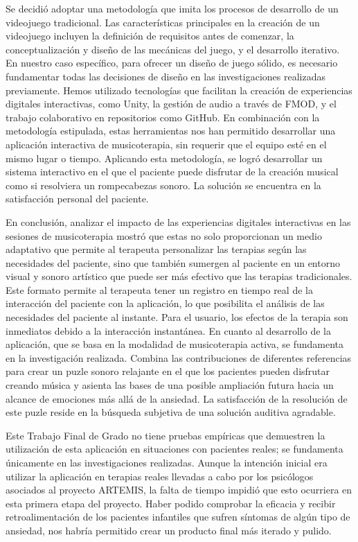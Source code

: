 Se decidió adoptar una metodología que imita los procesos de desarrollo de un videojuego tradicional. Las características principales en la creación de un videojuego incluyen la definición de requisitos antes de comenzar, la conceptualización y diseño de las mecánicas del juego, y el desarrollo iterativo. En nuestro caso específico, para ofrecer un diseño de juego sólido, es necesario fundamentar todas las decisiones de diseño en las investigaciones realizadas previamente. Hemos utilizado tecnologías que facilitan la creación de experiencias digitales interactivas, como Unity, la gestión de audio a través de FMOD, y el trabajo colaborativo en repositorios como GitHub. En combinación con la metodología estipulada, estas herramientas nos han permitido desarrollar una aplicación interactiva de musicoterapia, sin requerir que el equipo esté en el mismo lugar o tiempo. Aplicando esta metodología, se logró desarrollar un sistema interactivo en el que el paciente puede disfrutar de la creación musical como si resolviera un rompecabezas sonoro. La solución se encuentra en la satisfacción personal del paciente.

En conclusión, analizar el impacto de las experiencias digitales interactivas en las sesiones de musicoterapia mostró que estas no solo proporcionan un medio adaptativo que permite al terapeuta personalizar las terapias según las necesidades del paciente, sino que también sumergen al paciente en un entorno visual y sonoro artístico que puede ser más efectivo que las terapias tradicionales. Este formato permite al terapeuta tener un registro en tiempo real de la interacción del paciente con la aplicación, lo que posibilita el análisis de las necesidades del paciente al instante. Para el usuario, los efectos de la terapia son inmediatos debido a la interacción instantánea. En cuanto al desarrollo de la aplicación, que se basa en la modalidad de musicoterapia activa, se fundamenta en la investigación realizada. Combina las contribuciones de diferentes referencias para crear un puzle sonoro relajante en el que los pacientes pueden disfrutar creando música y asienta las bases de una posible ampliación futura hacia un alcance de emociones más allá de la ansiedad. La satisfacción de la resolución de este puzle reside en la búsqueda subjetiva de una solución auditiva agradable.

Este Trabajo Final de Grado no tiene pruebas empíricas que demuestren la utilización de esta aplicación en situaciones con pacientes reales; se fundamenta únicamente en las investigaciones realizadas. Aunque la intención inicial era utilizar la aplicación en terapias reales llevadas a cabo por los psicólogos asociados al proyecto ARTEMIS, la falta de tiempo impidió que esto ocurriera en esta primera etapa del proyecto. Haber podido comprobar la eficacia y recibir retroalimentación de los pacientes infantiles que sufren síntomas de algún tipo de ansiedad, nos habría permitido crear un producto final más iterado y pulido.

